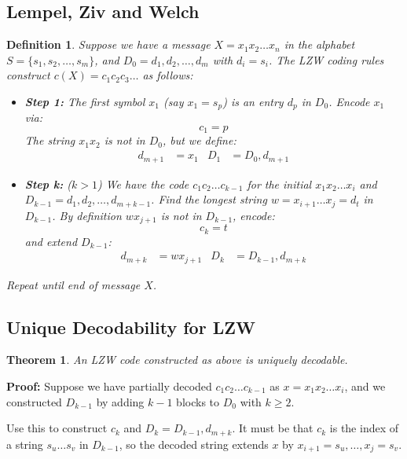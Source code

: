 \documentclass[11pt]{article}
\newtheorem{defn}{Definition}
\newtheorem{theo}{Theorem}
\begin{document}
\subsection{Lempel, Ziv and Welch}
\begin{defn}
  Suppose we have a message $X = x_1 x_2 \ldots x_n$ in the alphabet $S = \{ s_1, s_2, \ldots, s_m \}$, and $D_0 = d_1, d_2, \ldots, d_m$ with $d_i = s_i$.
  The LZW coding rules construct $c(X) = c_1 c_2 c_3 \ldots$ as follows:
  \begin{itemize}
    \item \textbf{Step 1:} The first symbol $x_1$ (say $x_1 = s_p$) is an entry $d_p$ in $D_0$.
      Encode $x_1$ via:
      \[
        c_1 = p
      \]
      The string $x_1 x_2$ is not in $D_0$, but we define:
      \begin{align*}
        d_{m + 1} &= x_1 & D_1 &= D_0, d_{m + 1}
      \end{align*}
    \item \textbf{Step k:} ($k > 1$) We have the code $c_1 c_2 \ldots c_{k - 1}$ for the initial $x_1 x_2 \ldots x_i$ and $D_{k - 1} = d_1, d_2, \ldots, d_{m + k - 1}$.
      Find the longest string $w = x_{i + 1} \ldots x_j = d_t$ in $D_{k - 1}$.
      By definition $wx_{j + 1}$ is not in $D_{k - 1}$, encode:
      \[
        c_k = t
      \]
      and extend $D_{k - 1}$:
      \begin{align*}
        d_{m + k} &= wx_{j + 1} & D_k &= D_{k - 1}, d_{m + k}
      \end{align*}
  \end{itemize}
  Repeat until end of message $X$.
\end{defn}

\subsection{Unique Decodability for LZW}
\begin{theo}
  An LZW code constructed as above is uniquely decodable.
\end{theo}

\textbf{Proof:}
Suppose we have partially decoded $c_1 c_2 \ldots c_{k - 1}$ as $x = x_1 x_2 \ldots x_i$, and we constructed $D_{k - 1}$ by adding $k - 1$ blocks to $D_0$ with $k \geq 2$.

Use this to construct $c_k$ and $D_k = D_{k - 1}, d_{m + k}$.
It must be that $c_k$ is the index of a string $s_u \ldots s_v$ in $D_{k - 1}$, so the decoded string extends $x$ by $x_{i + 1} = s_u, \ldots, x_j = s_v$.
\end{document}
